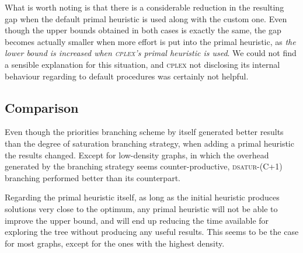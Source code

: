 What is worth noting is that there is a considerable reduction in the resulting gap when the default primal heuristic is used along with the custom one. Even though the upper bounds obtained in both cases is exactly the same, the gap becomes actually smaller when more effort is put into the primal heuristic, as \textit{the lower bound is increased when \textsc{cplex}'s primal heuristic is used}. We could not find a sensible explanation for this situation, and \textsc{cplex} not disclosing its internal behaviour regarding to default procedures was certainly not helpful.

\subsection{Comparison}

Even though the priorities branching scheme by itself generated better results than the degree of saturation branching strategy, when adding a primal heuristic the results changed. Except for low-density graphs, in which the overhead generated by the branching strategy seems counter-productive, \textsc{dsatur-(C+1)} branching performed better than its counterpart.

Regarding the primal heuristic itself, as long as the initial heuristic produces solutions very close to the optimum, any primal heuristic will not be able to improve the upper bound, and will end up reducing the time available for exploring the tree without producing any useful results. This seems to be the case for most graphs, except for the ones with the highest density.


